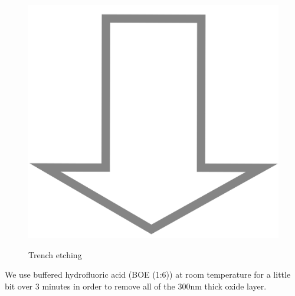 \begin{figure}[H]
	\centering
	\begin{tikzpicture}[node distance = 3cm, auto, thick,scale=\CrossSectionOnly, every node/.style={transform shape}]
		
	\end{tikzpicture} \\
	\includegraphics[scale=0.01]{down_arrow.png} \\
	\begin{tikzpicture}[node distance = 3cm, auto, thick,scale=\CrossSectionOnly, every node/.style={transform shape}]
		
	\end{tikzpicture}
	\caption{Trench etching}
\end{figure}

We use buffered hydrofluoric acid (BOE (1:6)) at room temperature for a little bit over 3 minutes in order to remove all of the 300nm thick oxide layer.